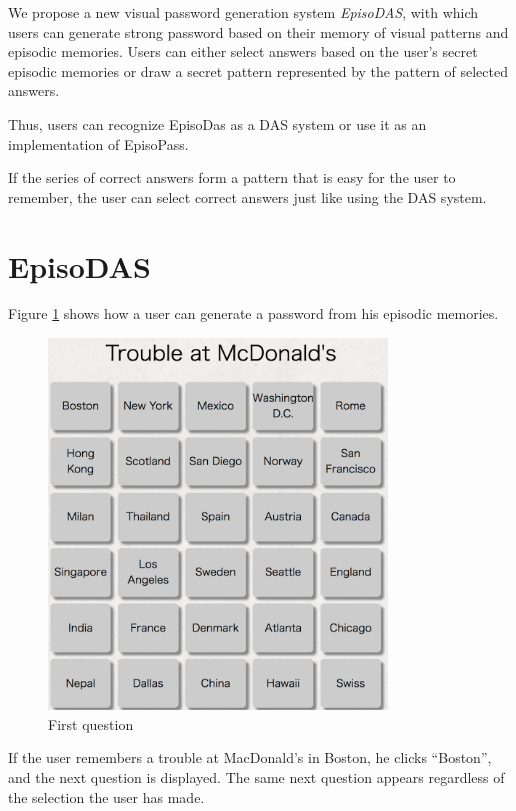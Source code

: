 \documentclass[sigconf]{acmart}
\begin{document}
We propose a new visual password generation system \textit{EpisoDAS},
with which users can generate strong password based on their
memory of visual patterns and episodic memories.
Users can either select answers based on the user's secret episodic memories or
draw a secret pattern represented by the pattern of selected answers.

Thus, users can recognize EpisoDas as a DAS system or
use it as an implementation of EpisoPass.


If the series of correct answers form a pattern
that is easy for the user to remember,
the user can select correct answers just like
using the DAS system.


\section{EpisoDAS}


Figure \ref{EpisoDAS1} shows how a user can generate a password from
his episodic memories.

\begin{figure}
  \includegraphics[width=9cm,bb=0 0 1130 1236]{figures/EpisoDAS1.png}
  \caption{First question}
  \label{EpisoDAS1}
\end{figure}

If the user remembers a trouble at MacDonald's in Boston,
he clicks ``Boston'', and the next question is displayed.
The same next question appears regardless of the selection
the user has made.
\end{document}
